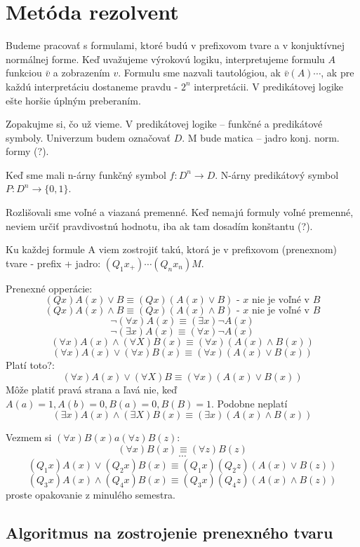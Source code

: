 \section{Metóda rezolvent}

\startFIXME

Budeme pracovať s formulami, ktoré budú v prefixovom tvare a v konjuktívnej normálnej
forme. Keď uvažujeme výrokovú logiku, interpretujeme formulu $A$ funkciou $\bar{v}$
a zobrazením $v$. Formulu sme nazvali tautológiou, ak $\bar{v}(A)\cdots$, ak pre každú
interpretáciu dostaneme pravdu - $2^n$ interpretácii. V predikátovej logike ešte horšie úplným preberaním.

Zopakujme si, čo už vieme. V predikátovej logike -- funkčné a predikátové symboly. Univerzum budem označovať $D$.
M bude matica -- jadro konj. norm. formy (?).

Keď sme mali n-árny funkčný symbol $f: D^n \rightarrow D$. N-árny predikátový symbol
$P: D^n \rightarrow \{0,1\}$.

Rozlišovali sme voľné a viazaná premenné. Keď nemajú formuly voľné premenné, neviem
určiť pravdivostnú hodnotu, iba ak tam dosadím konštantu (?).

Ku každej formule A viem zostrojiť takú, ktorá je v prefixovom (prenexnom) tvare -
prefix + jadro: $(Q_1 x_+)\cdots(Q_n x_n)M$.

Prenexné opperácie:
$$(Qx)A(x) \lor B \equiv (Qx)(A(x) \lor B) \mbox{ - $x$ nie je voľné v $B$} $$
$$ (Qx)A(x) \land B \equiv (Qx)(A(x) \land B) \mbox{ - $x$ nie je voľné v $B$} $$
$$ \neg (\forall x) A(x) \equiv (\exists x) \neg A(x) $$
$$ \neg (\exists x) A(x) \equiv (\forall x) \neg A(x) $$
$$ (\forall x) A(x) \land (\forall X) B(x) \equiv (\forall x) (A(x) \land B(x)) $$
$$ (\forall x) A(x) \lor (\forall x) B(x) \equiv (\forall x) (A(x) \lor B(x)) $$
Platí toto?:
$$(\forall x) A(x) \lor (\forall X) B \equiv (\forall x) (A(x) \lor B(x))$$
Môže platiť pravá strana a ľavá nie, keď $A(a)=1, A(b)=0, B(a)=0, B(B)=1$.
Podobne neplatí
$$(\exists x) A(x) \land (\exists X) B(x) \equiv (\exists x) (A(x) \land B(x))$$

Vezmem si $(\forall x)B(x) a (\forall z) B(z)$:
$$(\forall x) B(x) \equiv (\forall z) B(z) $$
$$\cdots$$
$$ (Q_1 x)A(x) \lor (Q_2 x)B(x) \equiv (Q_1 x)(Q_2 z)(A(x) \lor B(z)) $$
$$ (Q_3 x)A(x) \land (Q_4 x)B(x) \equiv (Q_3 x)(Q_4 z)(A(x) \land B(z)) $$
proste opakovanie z minulého semestra.

\subsection{Algoritmus na zostrojenie prenexného tvaru}
